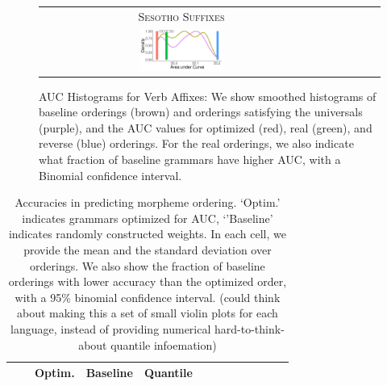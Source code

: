 \documentclass[11pt,letterpaper]{article}
\newcommand\mhahn[1]{{\color{red}(#1)}}
\begin{document}
\begin{figure}
\begin{tabular}{cccccc}
            \\
            \textsc{Sesotho Suffixes} \\
            \includegraphics[width=0.3\textwidth]{figures/sesotho_suffixes/suffixes-byMorphemes-auc-hist-heldout-Coarse-FineSurprisal-optimized.pdf}
    \end{tabular}

    
    \caption{AUC Histograms for Verb Affixes: We show smoothed histograms of baseline orderings (brown) and orderings satisfying the universals (purple), and the AUC values for optimized (red), real (green), and reverse (blue) orderings. For the real orderings, we also indicate what fraction of baseline grammars have higher AUC, with a Binomial confidence interval. }
    \label{fig:auc_verbs}
\end{figure}


\begin{table}[]
    \centering
    \begin{tabular}{l|l|ll|ll|lllllll}
     &   &     Optim. & Baseline & Quantile  \\ \hline
     
    \end{tabular}
    \caption{Accuracies in predicting morpheme ordering. `Optim.' indicates grammars optimized for AUC, `'Baseline' indicates randomly constructed weights.
    In each cell, we provide the mean and the standard deviation over orderings.
    We also show the fraction of baseline orderings with lower accuracy than the optimized order, with a 95\% binomial confidence interval.
    \mhahn{could think about making this a set of small violin plots for each language, instead of providing numerical hard-to-think-about quantile infoemation}
    }
    \label{tab:optimized_acc}
\end{table}

\end{document}
